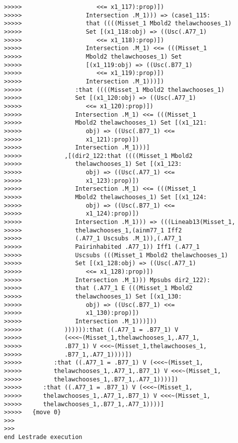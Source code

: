 \documentclass[12pt]{article}
\begin{document}
\begin{verbatim}
>>>>>                     <<= x1_117):prop)])
>>>>>                  Intersection .M_1))) => (case1_115:
>>>>>                  that ((((Misset_1 Mbold2 thelawchooses_1)
>>>>>                  Set [(x1_118:obj) => ((Usc(.A77_1)
>>>>>                     <<= x1_118):prop)])
>>>>>                  Intersection .M_1) <<= (((Misset_1
>>>>>                  Mbold2 thelawchooses_1) Set
>>>>>                  [(x1_119:obj) => ((Usc(.B77_1)
>>>>>                     <<= x1_119):prop)])
>>>>>                  Intersection .M_1)))])
>>>>>               :that ((((Misset_1 Mbold2 thelawchooses_1)
>>>>>               Set [(x1_120:obj) => ((Usc(.A77_1)
>>>>>                  <<= x1_120):prop)])
>>>>>               Intersection .M_1) <<= (((Misset_1
>>>>>               Mbold2 thelawchooses_1) Set [(x1_121:
>>>>>                  obj) => ((Usc(.B77_1) <<=
>>>>>                  x1_121):prop)])
>>>>>               Intersection .M_1)))]
>>>>>            ,[(dir2_122:that ((((Misset_1 Mbold2
>>>>>               thelawchooses_1) Set [(x1_123:
>>>>>                  obj) => ((Usc(.A77_1) <<=
>>>>>                  x1_123):prop)])
>>>>>               Intersection .M_1) <<= (((Misset_1
>>>>>               Mbold2 thelawchooses_1) Set [(x1_124:
>>>>>                  obj) => ((Usc(.B77_1) <<=
>>>>>                  x1_124):prop)])
>>>>>               Intersection .M_1))) => (((Lineab13(Misset_1,
>>>>>               thelawchooses_1,(ainm77_1 Iff2
>>>>>               (.A77_1 Uscsubs .M_1)),(.A77_1
>>>>>               Pairinhabited .A77_1)) Iff1 (.A77_1
>>>>>               Uscsubs (((Misset_1 Mbold2 thelawchooses_1)
>>>>>               Set [(x1_128:obj) => ((Usc(.A77_1)
>>>>>                  <<= x1_128):prop)])
>>>>>               Intersection .M_1))) Mpsubs dir2_122):
>>>>>               that (.A77_1 E (((Misset_1 Mbold2
>>>>>               thelawchooses_1) Set [(x1_130:
>>>>>                  obj) => ((Usc(.B77_1) <<=
>>>>>                  x1_130):prop)])
>>>>>               Intersection .M_1)))]))
>>>>>            )))))):that ((.A77_1 = .B77_1) V
>>>>>            (<<<~(Misset_1,thelawchooses_1,.A77_1,
>>>>>            .B77_1) V <<<~(Misset_1,thelawchooses_1,
>>>>>            .B77_1,.A77_1))))])
>>>>>         :that ((.A77_1 = .B77_1) V (<<<~(Misset_1,
>>>>>         thelawchooses_1,.A77_1,.B77_1) V <<<~(Misset_1,
>>>>>         thelawchooses_1,.B77_1,.A77_1))))])
>>>>>      :that ((.A77_1 = .B77_1) V (<<<~(Misset_1,
>>>>>      thelawchooses_1,.A77_1,.B77_1) V <<<~(Misset_1,
>>>>>      thelawchooses_1,.B77_1,.A77_1))))]
>>>>>   {move 0}
>>>
>>>
end Lestrade execution
\end{verbatim}
\end{document}
